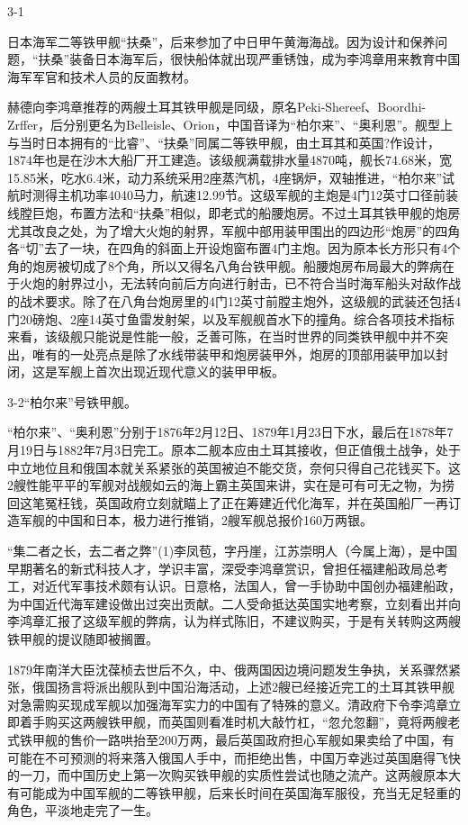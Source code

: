 \documentclass[12pt,UTF8]{ctexbook}
\begin{document}
3-1

日本海军二等铁甲舰“扶桑”，后来参加了中日甲午黄海海战。因为设计和保养问题，“扶桑”装备日本海军后，很快船体就出现严重锈蚀，成为李鸿章用来教育中国海军军官和技术人员的反面教材。

赫德向李鸿章推荐的两艘土耳其铁甲舰是同级，原名Peki-Shereef、Boordhi-Zrffer，后分别更名为Belleisle、Orion，中国音译为“柏尔来”、“奥利恩”。舰型上与当时日本拥有的“比睿”、“扶桑”同属二等铁甲舰，由土耳其和英国?作设计，1874年也是在沙木大船厂开工建造。该级舰满载排水量4870吨，舰长74.68米，宽15.85米，吃水6.4米，动力系统采用2座蒸汽机，4座锅炉，双轴推进，“柏尔来”试航时测得主机功率4040马力，航速12.99节。这级军舰的主炮是4门12英寸口径前装线膛巨炮，布置方法和“扶桑”相似，即老式的船腰炮房。不过土耳其铁甲舰的炮房尤其改良之处，为了增大火炮的射界，军舰中部用装甲围出的四边形“炮房”的四角各“切”去了一块，在四角的斜面上开设炮窗布置4门主炮。因为原本长方形只有4个角的炮房被切成了8个角，所以又得名八角台铁甲舰。船腰炮房布局最大的弊病在于火炮的射界过小，无法转向前后方向进行射击，已不符合当时海军船头对敌作战的战术要求。除了在八角台炮房里的4门12英寸前膛主炮外，这级舰的武装还包括4门20磅炮、2座14英寸鱼雷发射架，以及军舰舰首水下的撞角。综合各项技术指标来看，该级舰只能说是性能一般，乏善可陈，在当时世界的同类铁甲舰中并不突出，唯有的一处亮点是除了水线带装甲和炮房装甲外，炮房的顶部用装甲加以封闭，这是军舰上首次出现近现代意义的装甲甲板。

3-2“柏尔来”号铁甲舰。

“柏尔来”、“奥利恩”分别于1876年2月12日、1879年1月23日下水，最后在1878年7月19日与1882年7月3日完工。原本二舰本应由土耳其接收，但正值俄土战争，处于中立地位且和俄国本就关系紧张的英国被迫不能交货，奈何只得自己花钱买下。这2艘性能平平的军舰对战舰如云的海上霸主英国来讲，实在是可有可无之物，为捞回这笔冤枉钱，英国政府立刻就瞄上了正在筹建近代化海军，并在英国船厂一再订造军舰的中国和日本，极力进行推销，2艘军舰总报价160万两银。

“集二者之长，去二者之弊”(1)李凤苞，字丹崖，江苏崇明人（今属上海），是中国早期著名的新式科技人才，学识丰富，深受李鸿章赏识，曾担任福建船政局总考工，对近代军事技术颇有认识。日意格，法国人，曾一手协助中国创办福建船政，为中国近代海军建设做出过突出贡献。二人受命抵达英国实地考察，立刻看出并向李鸿章汇报了这级军舰的弊病，认为样式陈旧，不建议购买，于是有关转购这两艘铁甲舰的提议随即被搁置。

1879年南洋大臣沈葆桢去世后不久，中、俄两国因边境问题发生争执，关系骤然紧张，俄国扬言将派出舰队到中国沿海活动，上述2艘已经接近完工的土耳其铁甲舰对急需购买现成军舰以加强海军实力的中国有了特殊的意义。清政府下令李鸿章立即着手购买这两艘铁甲舰，而英国则看准时机大敲竹杠，“忽允忽翻”，竟将两艘老式铁甲舰的售价一路哄抬至200万两，最后英国政府担心军舰如果卖给了中国，有可能在不可预测的将来落入俄国人手中，而拒绝出售，中国万幸逃过英国磨得飞快的一刀，而中国历史上第一次购买铁甲舰的实质性尝试也随之流产。这两艘原本大有可能成为中国军舰的二等铁甲舰，后来长时间在英国海军服役，充当无足轻重的角色，平淡地走完了一生。
\end{document}
